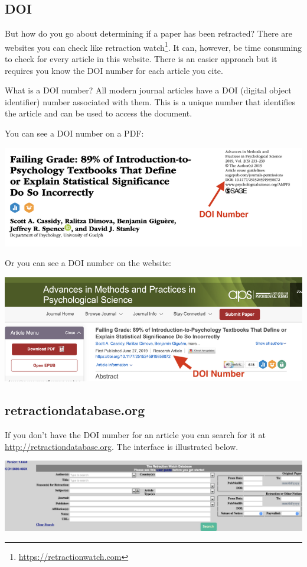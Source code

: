 \documentclass[
]{krantz}
\renewcommand{\href}[2]{#2\footnote{\url{#1}}}
\begin{document}
\hypertarget{doi}{%
\subsection{DOI}\label{doi}}

But how do you go about determining if a paper has been retracted? There are websites you can check like \href{https://retractionwatch.com}{retraction watch}. It can, however, be time consuming to check for every article in this website. There is an easier approach but it requires you know the DOI number for each article you cite.

What is a DOI number? All modern journal articles have a DOI (digital object identifier) number associated with them. This is a unique number that identifies the article and can be used to access the document.

You can see a DOI number on a PDF:

\includegraphics[width=0.6\linewidth]{ch_tools/images/doi_pdf}

Or you can see a DOI number on the website:

\includegraphics[width=0.6\linewidth]{ch_tools/images/doi_website}

\hypertarget{retractiondatabase.org}{%
\subsection{retractiondatabase.org}\label{retractiondatabase.org}}

If you don't have the DOI number for an article you can search for it at \url{http://retractiondatabase.org}. The interface is illustrated below.

\includegraphics[width=1\linewidth]{ch_tools/images/retractiondb}
\end{document}
